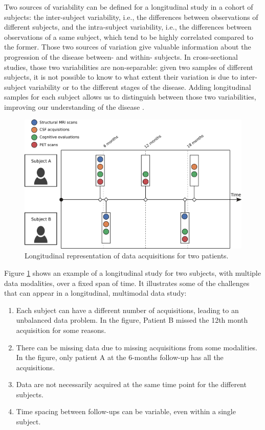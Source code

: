 Two sources of variability can be defined for a longitudinal study in a cohort of subjects: the inter-subject variability, i.e., the differences between observations of different subjects, and the intra-subject variability, i.e., the differences between observations of a same subject, which tend to be highly correlated compared to the former. Those two sources of variation give valuable information about the progression of the disease between- and within- subjects. In cross-sectional studies, those two variabilities are non-separable: given two samples of different subjects, it is not possible to know to what extent their variation is due to inter-subject variability or to the different stages of the disease. Adding longitudinal samples for each subject allows us to distinguish between those two variabilities, improving our understanding of the disease \cite{Fitzmaurice2008}. \\

\begin{figure}[htbp]
  \centering
  \includegraphics[width=1.0\textwidth]{figures/introduction/Fig2.pdf}
  \caption{Longitudinal representation of data acquisitions for two patients.}
  \label{long}
\end{figure}

Figure \ref{long} shows an example of a longitudinal study for two subjects, with multiple data modalities, over a fixed span of time. It illustrates some of the challenges that can appear in a longitudinal, multimodal data study: \\

\begin{enumerate}\itemsep5pt
\item Each subject can have a different number of acquisitions, leading to an unbalanced data problem. In the figure, Patient B missed the 12th month acquisition for some reasons.
\item There can be missing data due to missing acquisitions from some modalities. In the figure, only patient A at the 6-months follow-up has all the acquisitions. 
\item Data are not necessarily acquired at the same time point for the different subjects.
\item Time spacing between follow-ups can be variable, even within a single subject.
\end{enumerate}

